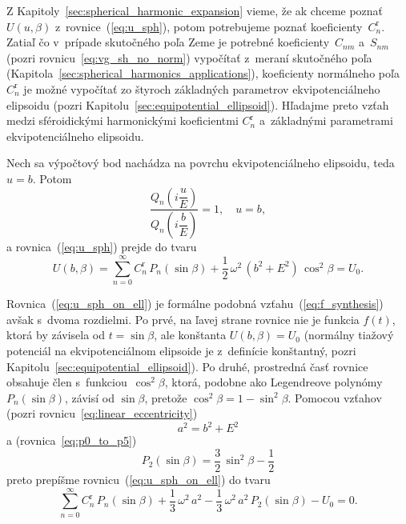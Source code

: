 \documentclass[a4paper, 12pt]{book}
\begin{document}
Z Kapitoly~\ref{sec:spherical_harmonic_expansion} vieme, že ak chceme poznať 
$U(u,\beta)$ z~rovnice~(\ref{eq:u_sph}), potom potrebujeme poznať 
koeficienty~$C_n^\mathrm{r}$.  Zatiaľ čo v~prípade skutočného poľa Zeme je 
potrebné koeficienty~$C_{nm}$ a~$S_{nm}$ (pozri rovnicu~\ref{eq:vg_sh_no_norm}) 
vypočítať z~meraní skutočného poľa 
(Kapitola~\ref{sec:spherical_harmonics_applications}), koeficienty normálneho 
poľa $C_n^\mathrm{r}$ je možné vypočítať zo štyroch základných parametrov 
ekvipotenciálneho elipsoidu (pozri Kapitolu~\ref{sec:equipotential_ellipsoid}).  
Hľadajme preto vzťah medzi sféroidickými harmonickými koeficientmi 
$C_n^\mathrm{r}$ a~základnými parametrami ekvipotenciálneho elipsoidu.

Nech sa výpočtový bod nachádza na povrchu ekvipotenciálneho elipsoidu, teda $u 
= b$.  Potom
%
\begin{equation}
\frac{Q_n\left( i \dfrac{u}{E} \right)}{Q_n\left( i \dfrac{b}{E} \right)} 
= 1{,} \quad u = b{,}
\end{equation}
%
a rovnica~(\ref{eq:u_sph}) prejde do tvaru
%
\begin{equation}
\label{eq:u_sph_on_ell}
U(b, \beta) = \sum_{n = 0}^\infty C^{\mathrm{r}}_n \, P_n(\sin\beta) 
+ \frac{1}{2} \, \omega^2 \, (b^2 + E^2) \, \cos^2\beta = U_0{.}
\end{equation}

Rovnica~(\ref{eq:u_sph_on_ell}) je formálne podobná 
vzťahu~(\ref{eq:f_synthesis}) avšak s~dvoma rozdielmi.  Po prvé, na ľavej 
strane rovnice nie je funkcia $f(t)$, ktorá by závisela od $t = \sin\beta$, ale 
konštanta $U(b, \beta) = U_0$ (normálny tiažový potenciál na ekvipotenciálnom 
elipsoide je z~definície konštantný, pozri 
Kapitolu~\ref{sec:equipotential_ellipsoid}).  Po druhé, prostredná časť rovnice 
obsahuje člen s~funkciou~$\cos^2\beta$, ktorá, podobne ako Legendreove 
polynómy~$P_n(\sin\beta)$, závisí od $\sin\beta$, pretože $\cos^2\beta 
= 1 - \sin^2\beta$.  Pomocou vzťahov (pozri 
rovnicu~\ref{eq:linear_eccentricity})
%
\begin{equation}
a^2 = b^2 + E^2
\end{equation}
%
a (rovnica~\ref{eq:p0_to_p5})
%
\begin{equation}
P_2(\sin\beta) = \frac{3}{2} \, \sin^2\beta - \frac{1}{2}
\end{equation}
%
preto prepíšme rovnicu~(\ref{eq:u_sph_on_ell}) do tvaru
%
\begin{equation}
\label{eq:cnr}
\sum_{n = 0}^\infty C^{\mathrm{r}}_n \, P_n(\sin\beta) + \frac{1}{3} \, 
\omega^2 \, a^2  - \frac{1}{3} \, \omega^2 \, a^2 \, P_2(\sin\beta) - U_0 
= 0{.}
\end{equation}
\end{document}
